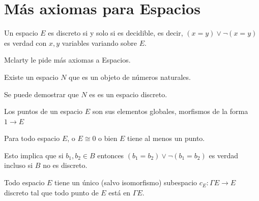 \begin{center}
\end{center}

\section{Más axiomas para Espacios}

\begin{definition}
  Un espacio $E$ es discreto si y solo si es decidible, es decir, $(x=y) \lor \lnot(x = y)$ es verdad con $x,y$ variables
  variando sobre $E$.
\end{definition}

Mclarty le pide más axiomas a Espacios.

\begin{axioma}
Existe un espacio $N$ que es un objeto de números naturales.
\end{axioma}

Se puede demostrar que $N$ es es un espacio discreto.

\begin{definition}
Los puntos de un espacio $E$ son sus elementos globales, morfismos de la forma $1\to E$
\end{definition}

\begin{axioma}
Para todo espacio $E$, o $E \cong  0 $ o bien $E$ tiene al menos un punto.
\end{axioma}

Esto implica que si $b_1, b_2\in B$ entonces $(b_1=b_2)\lor \lnot(b_1=b_2)$ es verdad incluso si $B$ no es discreto.

\begin{axioma}
Todo espacio $E$ tiene un único (salvo isomorfismo) subespacio $c_E\colon\Gamma E\to E$ discreto tal que todo punto de $E$ está en $\Gamma E$. 
\end{axioma} 